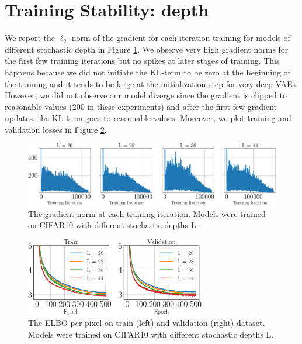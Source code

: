 \newpage
\section{Training Stability: depth}\label{appx:depth_experiment}

We report the $\ell_2$-norm of the gradient for each iteration training for models of different stochastic depth in Figure \ref{fig:grad_norm_depth}. We observe very high gradient norms for the first few training iterations but no spikes at later stages of training. 
This happens because we did not initiate the KL-term to be zero at the beginning of the training and it tends to be large at the initialization step for very deep VAEs. 
However, we did not observe our model diverge since the gradient is clipped to reasonable values (200 in these experiments) and after the first few gradient updates, the KL-term goes to reasonable values.
Moreover, we plot training and validation losses in Figure \ref{fig:losses_depth}.

\begin{figure}[!htbp] 
\includegraphics[width=\textwidth]{pics/5_dvp/cifar_depth_grad_norm.pdf}
\caption{The gradient norm at each training iteration. Models were trained on CIFAR10 with different stochastic depths $\mathrm{L}$.}
\label{fig:grad_norm_depth}
\end{figure}

\begin{figure}[!htbp] 
\centering
\includegraphics[width=0.7\textwidth]{pics/5_dvp/cifar_depth_losses.pdf}
\caption{The ELBO per pixel on train (left) and validation (right) dataset. Models were trained on CIFAR10 with different stochastic depths $\mathrm{L}$.}
\label{fig:losses_depth}
\end{figure}

